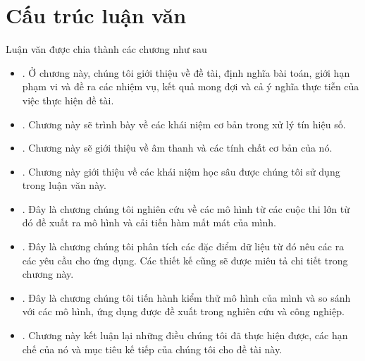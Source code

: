 	\section{Cấu trúc luận văn}
	
		Luận văn được chia thành các chương như sau
		
			\begin{itemize}
				\item \textbf{}. Ở chương này, chúng tôi giới thiệu về đề tài, định nghĩa bài toán, giới hạn phạm vi và đề ra các nhiệm vụ, kết quả mong đợi và cả ý nghĩa thực tiễn của việc thực hiện đề tài.
				\item \textbf{}. Chương này sẽ trình bày về các khái niệm cơ bản trong xử lý tín hiệu số.
				\item \textbf{}. Chương này sẽ giới thiệu về âm thanh và các tính chất cơ bản của nó.
				\item \textbf{}. Chương này giới thiệu về các khái niệm học sâu được chúng tôi sử dụng trong luận văn này.
				\item \textbf{}. Đây là chương chúng tôi nghiên cứu về các mô hình từ các cuộc thi lớn từ đó đề xuất ra mô hình và cải tiến hàm mất mát của mình.
				\item \textbf{}.
				Đây là chương chúng tôi phân tích các đặc điểm dữ liệu từ đó nêu các ra các yêu cầu cho ứng dụng. Các thiết kế cũng sẽ được miêu tả chi tiết trong chương này.
				\item \textbf{}. Đây là chương chúng tôi tiến hành kiểm thử mô hình của mình và so sánh với các mô hình, ứng dụng được đề xuất trong nghiên cứu và công nghiệp.
				\item \textbf{}. Chương này kết luận lại những điều chúng tôi đã thực hiện được, các hạn chế của nó và mục tiêu kế tiếp của chúng tôi cho đề tài này.
			\end{itemize}
